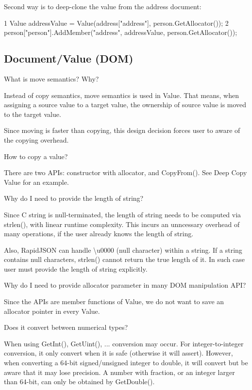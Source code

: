 \begin{DoxyEnumerate}
Second way is to deep-\/clone the value from the address document\+: 
\begin{DoxyCode}
1 Value addressValue = Value(address["address"], person.GetAllocator());
2 person["person"].AddMember("address", addressValue, person.GetAllocator());
\end{DoxyCode}

\end{DoxyEnumerate}

\subsection*{Document/\+Value (D\+OM)}


\begin{DoxyEnumerate}
\item What is move semantics? Why?

Instead of copy semantics, move semantics is used in {\ttfamily Value}. That means, when assigning a source value to a target value, the ownership of source value is moved to the target value.

Since moving is faster than copying, this design decision forces user to aware of the copying overhead.
\item How to copy a value?

There are two A\+P\+Is\+: constructor with allocator, and {\ttfamily Copy\+From()}. See Deep Copy Value for an example.
\item Why do I need to provide the length of string?

Since C string is null-\/terminated, the length of string needs to be computed via {\ttfamily strlen()}, with linear runtime complexity. This incurs an unncessary overhead of many operations, if the user already knows the length of string.

Also, Rapid\+J\+S\+ON can handle {\ttfamily \textbackslash{}u0000} (null character) within a string. If a string contains null characters, {\ttfamily strlen()} cannot return the true length of it. In such case user must provide the length of string explicitly.
\item Why do I need to provide allocator parameter in many D\+OM manipulation A\+PI?

Since the A\+P\+Is are member functions of {\ttfamily Value}, we do not want to save an allocator pointer in every {\ttfamily Value}.
\item Does it convert between numerical types?

When using {\ttfamily Get\+Int()}, {\ttfamily Get\+Uint()}, ... conversion may occur. For integer-\/to-\/integer conversion, it only convert when it is safe (otherwise it will assert). However, when converting a 64-\/bit signed/unsigned integer to double, it will convert but be aware that it may lose precision. A number with fraction, or an integer larger than 64-\/bit, can only be obtained by {\ttfamily Get\+Double()}.
\end{DoxyEnumerate}

